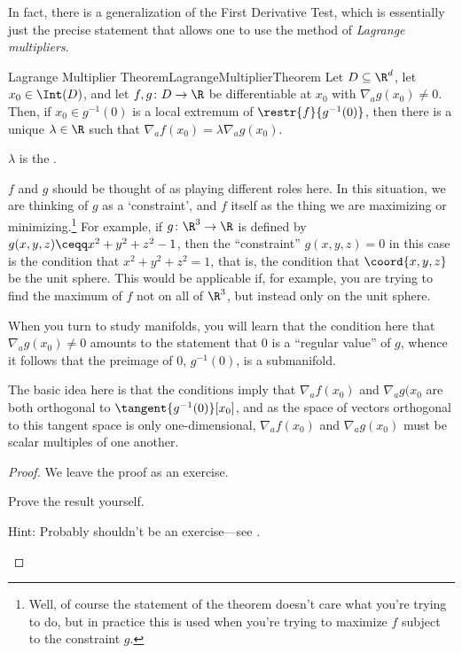 In fact, there is a generalization of the First Derivative Test, which is essentially just the precise statement that allows one to use the method of \emph{Lagrange multipliers}.
\begin{thm}{Lagrange Multiplier Theorem}{LagrangeMultiplierTheorem}
Let $D\subseteq \R ^d$, let $x_0\in \Int (D)$, and let $f,g\colon D\rightarrow \R$ be differentiable at $x_0$ with $\nabla _ag(x_0)\neq 0$.  Then, if $x_0\in g^{-1}(0)$ is a local extremum of $\restr{f}{g^{-1}(0)}$, then there is a unique $\lambda \in \R$ such that $\nabla _af(x_0)=\lambda \nabla _ag(x_0)$.
\begin{rmk}
$\lambda$ is the .
\end{rmk}
\begin{rmk}
$f$ and $g$ should be thought of as playing different roles here.  In this situation, we are thinking of $g$ as a `constraint', and $f$ itself as the thing we are maximizing or minimizing.\footnote{Well, of course the statement of the theorem doesn't care what you're trying to do, but in practice this is used when you're trying to maximize $f$ subject to the constraint $g$.}  For example, if $g\colon \R ^3\rightarrow \R$ is defined by $g(x,y,z)\ceqq x^2+y^2+z^2-1$, then the ``constraint'' $g(x,y,z)=0$ in this case is the condition that $x^2+y^2+z^2=1$, that is, the condition that $\coord{x,y,z}$ be the unit sphere.  This would be applicable if, for example, you are trying to find the maximum of $f$ not on all of $\R ^3$, but instead only on the unit sphere.
\end{rmk}
\begin{rmk}
When you turn to study manifolds, you will learn that the condition here that $\nabla _ag(x_0)\neq 0$ amounts to the statement that $0$ is a ``regular value'' of $g$, whence it follows that the preimage of $0$, $g^{-1}(0)$, is a submanifold.
\end{rmk}
\begin{rmk}
The basic idea here is that the conditions imply that $\nabla _af(x_0)$ and $\nabla _ag(x_0$ are both orthogonal to $\tangent{g^{-1}(0)}[x_0]$, and as the space of vectors orthogonal to this tangent space is only one-dimensional, $\nabla _af(x_0)$ and $\nabla _ag(x_0)$ must be scalar multiples of one another.
\end{rmk}
\begin{proof}
We leave the proof as an exercise.
\begin{exr}[breakable=false]{}{}
Prove the result yourself.
\begin{rmk}
Hint:  Probably shouldn't be an exercise---see \cite[Theorem 5.8.3]{Sally}.
\end{rmk}
\end{exr}
\end{proof}
\end{thm}
